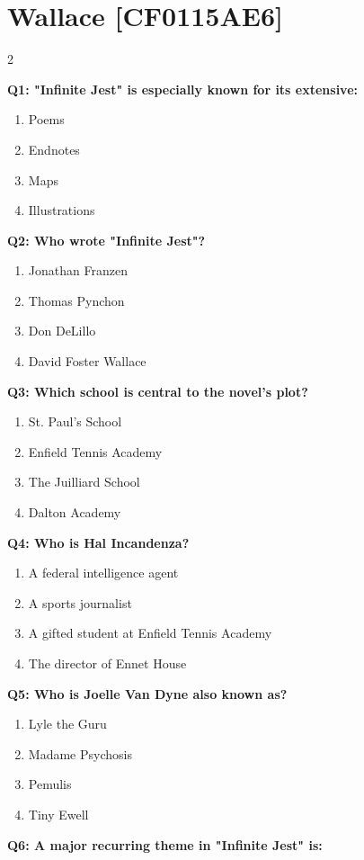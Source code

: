\documentclass[10pt]{article}
\begin{document}
\section*{Wallace \footnotesize [CF0115AE6]}
\begin{multicols}{2}

\textbf{Q1: "Infinite Jest" is especially known for its extensive:}

\begin{enumerate}[label=\arabic*.]
\item Poems
\item Endnotes
\item Maps
\item Illustrations
\end{enumerate}
\textbf{Q2: Who wrote "Infinite Jest"?}

\begin{enumerate}[label=\arabic*.]
\item Jonathan Franzen
\item Thomas Pynchon
\item Don DeLillo
\item David Foster Wallace
\end{enumerate}
\textbf{Q3: Which school is central to the novel's plot?}

\begin{enumerate}[label=\arabic*.]
\item St. Paul's School
\item Enfield Tennis Academy
\item The Juilliard School
\item Dalton Academy
\end{enumerate}
\textbf{Q4: Who is Hal Incandenza?}

\begin{enumerate}[label=\arabic*.]
\item A federal intelligence agent
\item A sports journalist
\item A gifted student at Enfield Tennis Academy
\item The director of Ennet House
\end{enumerate}
\textbf{Q5: Who is Joelle Van Dyne also known as?}

\begin{enumerate}[label=\arabic*.]
\item Lyle the Guru
\item Madame Psychosis
\item Pemulis
\item Tiny Ewell
\end{enumerate}
\textbf{Q6: A major recurring theme in "Infinite Jest" is:}


\end{multicols}
\end{document}
